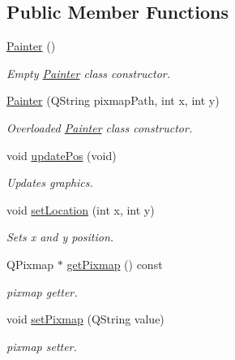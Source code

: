 \subsection*{Public Member Functions}
\begin{DoxyCompactItemize}
\item 
\mbox{\hyperlink{class_painter_a32e59ad4d0e130f57c419bd9e9c84675}{Painter}} ()
\begin{DoxyCompactList}\small\item\em Empty \mbox{\hyperlink{class_painter}{Painter}} class constructor. \end{DoxyCompactList}\item 
\mbox{\hyperlink{class_painter_a8a03ffdfcd500771584e662c1de2ef25}{Painter}} (Q\+String pixmap\+Path, int x, int y)
\begin{DoxyCompactList}\small\item\em Overloaded \mbox{\hyperlink{class_painter}{Painter}} class constructor. \end{DoxyCompactList}\item 
void \mbox{\hyperlink{class_painter_a28975648307f4885c65769088dfc7236}{update\+Pos}} (void)
\begin{DoxyCompactList}\small\item\em Updates graphics. \end{DoxyCompactList}\item 
void \mbox{\hyperlink{class_painter_a37b3c5e56ec8ae79c781a4f022082c5f}{set\+Location}} (int x, int y)
\begin{DoxyCompactList}\small\item\em Sets x and y position. \end{DoxyCompactList}\item 
\mbox{\label{class_painter_aee846fac5a2a67d71133a9daed1c24fe}} 
Q\+Pixmap $\ast$ \mbox{\hyperlink{class_painter_aee846fac5a2a67d71133a9daed1c24fe}{get\+Pixmap}} () const
\begin{DoxyCompactList}\small\item\em pixmap getter. \end{DoxyCompactList}\item 
\mbox{\label{class_painter_a6439d816409cc7fbf3aa751a94e6771f}} 
void \mbox{\hyperlink{class_painter_a6439d816409cc7fbf3aa751a94e6771f}{set\+Pixmap}} (Q\+String value)
\begin{DoxyCompactList}\small\item\em pixmap setter. \end{DoxyCompactList}\item 

\end{DoxyCompactItemize}
